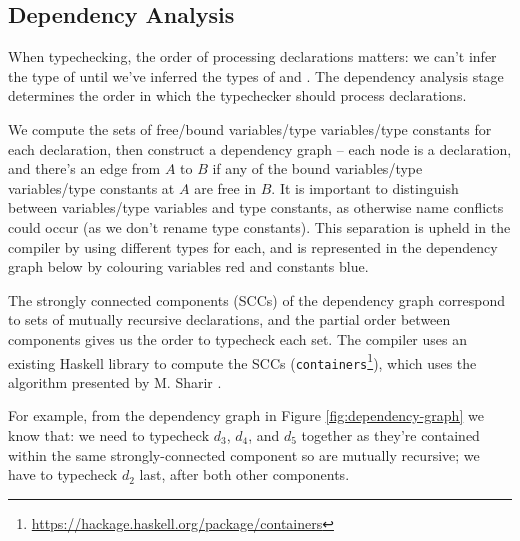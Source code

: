 \documentclass[dissertation.tex]{subfiles}
\begin{document}
{{    }
    \subsection{Dependency Analysis}\label{sec:dependency-analysis}
    {

        When typechecking, the order of processing declarations matters: we can't infer the type of  until we've inferred the types of  and . The dependency analysis stage determines
        the order in which the typechecker should process declarations.

        We compute the sets of free/bound variables/type variables/type constants for each declaration, then construct a
        dependency graph -- each node is a declaration, and there's an edge from \(A\) to \(B\) if any of the bound
        variables/type variables/type constants at \(A\) are free in \(B\). It is important to distinguish between
        variables/type variables and type constants, as otherwise name conflicts could occur (as we don't rename type
        constants). This separation is upheld in the compiler by using different types for each, and is represented in
        the dependency graph below by colouring variables red and constants blue.

        The strongly connected components (SCCs) of the dependency graph correspond to sets of mutually recursive
        declarations, and the partial order between components gives us the order to typecheck each set. The compiler
        uses an existing Haskell library to compute the SCCs
        (\texttt{containers}\footnote{\url{https://hackage.haskell.org/package/containers}}), which uses the algorithm
        presented by M. Sharir \cite{SCC}.

        For example, from the dependency graph in Figure \ref{fig:dependency-graph} we know that: we need to typecheck
        \(d_3\), \(d_4\), and \(d_5\) together as they're contained within the same strongly-connected component so are
        mutually recursive; we have to typecheck \(d_2\) last, after both other components.

}}
\end{document}
